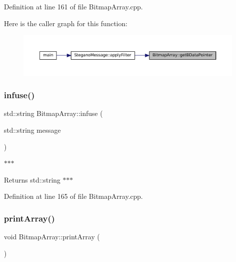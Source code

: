 Definition at line 161 of file Bitmap\+Array.\+cpp.

Here is the caller graph for this function\+:
\nopagebreak
\begin{figure}[H]
\begin{center}
\leavevmode
\includegraphics[width=350pt]{classBitmapArray_ab914d6282460b386b2b5f936190487a2_icgraph}
\end{center}
\end{figure}
\mbox{\label{classBitmapArray_a60edd8332724d4eb1ca37c91f0fefdc8}} 
\subsubsection{\texorpdfstring{infuse()}{infuse()}}
{\footnotesize\ttfamily std\+::string Bitmap\+Array\+::infuse (\begin{DoxyParamCaption}\item[{std\+::string}]{message }\end{DoxyParamCaption})}



$\ast$$\ast$$\ast$ 

\begin{DoxyReturn}{Returns}
std\+::string $\ast$$\ast$$\ast$ 
\end{DoxyReturn}


Definition at line 165 of file Bitmap\+Array.\+cpp.

\mbox{\label{classBitmapArray_a0580ddeedca7f59fd8d43ec92e6bb4a1}} 
\subsubsection{\texorpdfstring{printArray()}{printArray()}\hspace{0.1cm}{\footnotesize\ttfamily [1/2]}}
{\footnotesize\ttfamily void Bitmap\+Array\+::print\+Array (\begin{DoxyParamCaption}{ }\end{DoxyParamCaption})}



